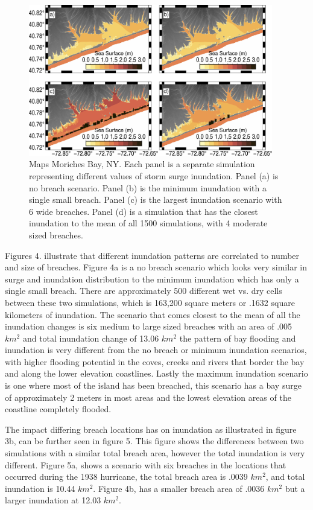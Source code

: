 \documentclass{coastal_paper}
\begin{document}
\begin{figure}
    \centering
    \includegraphics[width=0.95\textwidth]{figures/fig4.pdf}

    \caption{Maps Moriches Bay, NY. Each panel is a separate simulation representing different values of storm surge inundation. Panel (a) is no breach scenario. Panel (b) is the minimum inundation with a single small breach. Panel (c) is the largest inundation scenario with 6 wide breaches. Panel (d)  is a simulation that has the closest inundation to the mean of all 1500 simulations, with 4 moderate sized breaches.}
    \label{fig:4}
\end{figure}

Figures 4. illustrate that different inundation patterns are correlated to number and size of breaches. Figure 4a is a no breach scenario which looks very similar in surge and inundation distribution to the minimum inundation which has only a single small breach. There are approximately 500 different wet vs. dry cells between these two simulations, which is 163,200 square meters or .1632 square kilometers of inundation. The scenario that comes closest to the mean of all the inundation changes is six medium to large sized breaches with an area of .005 $km^2$ and total inundation change of 13.06 $km^2$ the pattern of bay flooding and inundation is very different from the no breach or minimum inundation scenarios, with higher flooding potential in the coves, creeks and rivers that border the bay and along the lower elevation coastlines. Lastly the maximum inundation scenario is one where most of the island has been breached, this scenario has a bay surge of approximately 2 meters in most areas and the lowest elevation areas of the coastline completely flooded.

The impact differing breach locations has on inundation as illustrated in figure 3b, can be further seen in figure 5. This figure shows the differences between two simulations with a similar total breach area, however the total inundation is very different. Figure 5a, shows a scenario with six breaches in the locations that occurred during the 1938 hurricane, the total breach area is .0039 $km^2$, and total inundation is 10.44 $km^2$. Figure 4b, has a smaller breach area of .0036 $km^2$ but a larger inundation at 12.03 $km^2$.
\end{document}

